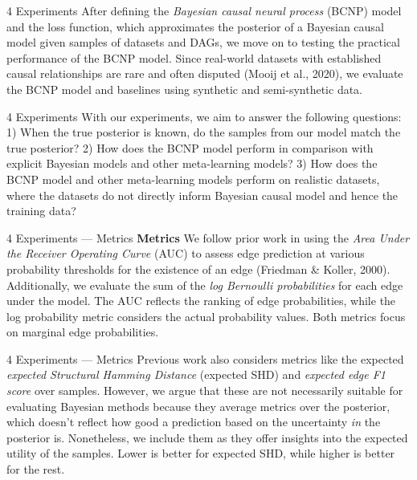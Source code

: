 \documentclass[aspectratio=169,10pt]{beamer}
\begin{document}
\begin{frame}{4 Experiments}
After defining the \textit{Bayesian causal neural process} (BCNP) model and the loss function, which approximates the posterior of a Bayesian causal model given samples of datasets and DAGs, we move on to testing the practical performance of the BCNP model. Since real-world datasets with established causal relationships are rare and often disputed (Mooij et al., 2020), we evaluate the BCNP model and baselines using synthetic and semi-synthetic data.
\end{frame}

\begin{frame}{4 Experiments}
\small
With our experiments, we aim to answer the following questions: 1) When the true posterior is known, do the samples from our model match the true posterior? 2) How does the BCNP model perform in comparison with explicit Bayesian models and other meta-learning models? 3) How does the BCNP model and other meta-learning models perform on realistic datasets, where the datasets do not directly inform Bayesian causal model and hence the training data?
\end{frame}

\begin{frame}{4 Experiments --- Metrics}
\textbf{Metrics}\quad
We follow prior work in using the \textit{Area Under the Receiver Operating Curve} (AUC) to assess edge prediction at various probability thresholds for the existence of an edge (Friedman \& Koller, 2000). Additionally, we evaluate the sum of the \textit{log Bernoulli probabilities} for each edge under the model. The AUC reflects the ranking of edge probabilities, while the log probability metric considers the actual probability values. Both metrics focus on marginal edge probabilities.
\end{frame}

\begin{frame}{4 Experiments --- Metrics}
\small
Previous work also considers metrics like the expected \textit{expected Structural Hamming Distance} (expected SHD) and \textit{expected edge F1 score} over samples. However, we argue that these are not necessarily suitable for evaluating Bayesian methods because they average metrics over the posterior, which doesn't reflect how good a prediction based on the uncertainty \emph{in} the posterior is. Nonetheless, we include them as they offer insights into the expected utility of the samples. Lower is better for expected SHD, while higher is better for the rest.
\end{frame}
\end{document}

